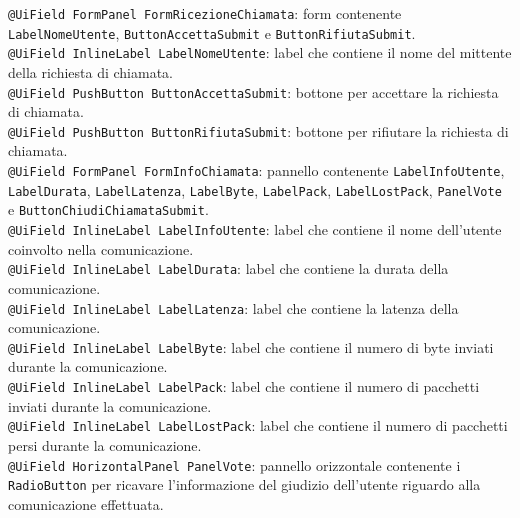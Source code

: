 {\begin{sloppypar}
{{\begin{itemize}
					\texttt{@UiField FormPanel FormRicezioneChiamata}: form contenente 
						\texttt{LabelNomeUtente}, \texttt{ButtonAccettaSubmit} e \texttt{ButtonRifiutaSubmit}.\\

					\texttt{@UiField InlineLabel LabelNomeUtente}: label che contiene il nome del mittente 
						della richiesta di chiamata.\\

					\texttt{@UiField PushButton ButtonAccettaSubmit}: bottone per accettare la richiesta 
						di chiamata.\\

					\texttt{@UiField PushButton ButtonRifiutaSubmit}: bottone per rifiutare la richiesta 
						di chiamata.\\

					\texttt{@UiField FormPanel FormInfoChiamata}: pannello contenente 
						\texttt{LabelInfoUtente}, \texttt{LabelDurata}, \texttt{LabelLatenza}, \texttt{LabelByte}, 
						\texttt{LabelPack}, \texttt{LabelLostPack}, \texttt{PanelVote} e \texttt{ButtonChiudiChiamataSubmit}.\\

					\texttt{@UiField InlineLabel LabelInfoUtente}: label che contiene il nome dell'utente 
						coinvolto nella comunicazione.\\

					\texttt{@UiField InlineLabel LabelDurata}: label che contiene la durata della 
						comunicazione.\\

					\texttt{@UiField InlineLabel LabelLatenza}: label che contiene la latenza della 
						comunicazione.\\

					\texttt{@UiField InlineLabel LabelByte}: label che contiene il numero di byte inviati 
						durante la comunicazione.\\

					\texttt{@UiField InlineLabel LabelPack}:  label che contiene il numero di pacchetti 
						inviati durante la comunicazione.\\

					\texttt{@UiField InlineLabel LabelLostPack}: label che contiene il numero di pacchetti 
						persi durante la comunicazione.\\

					\texttt{@UiField HorizontalPanel PanelVote}: pannello orizzontale contenente i 
						\texttt{RadioButton} per ricavare l'informazione del giudizio dell'utente riguardo alla 
						comunicazione effettuata.\\


\end{itemize}}}
\end{sloppypar}}
